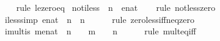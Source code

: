 \begin{isabellebody}
%
\isadelimproof
\ \ %
\endisadelimproof
%
\isatagproof
{}\isamarkupfalse%
\ {\isacharparenleft}rule\ le{\isacharunderscore}zero{\isacharunderscore}eq{\isacharparenright}%
\endisatagproof
{\isafoldproof}%
%
\isadelimproof
\isanewline
%
\endisadelimproof
\isanewline
{}\isamarkupfalse%
\ not{\isacharunderscore}iless{}{\isacharcolon}\ {\isachardoublequoteopen}{\isasymnot}\ n\ {\isacharless}\ {\isacharparenleft}{}{\isacharcolon}{\isacharcolon}enat{\isacharparenright}{\isachardoublequoteclose}\isanewline
%
\isadelimproof
\ \ %
\endisadelimproof
%
\isatagproof
{}\isamarkupfalse%
\ {\isacharparenleft}rule\ not{\isacharunderscore}less{\isacharunderscore}zero{\isacharparenright}%
\endisatagproof
{\isafoldproof}%
%
\isadelimproof
\isanewline
%
\endisadelimproof
\isanewline
{}\isamarkupfalse%
\ i{}{\isacharunderscore}less{\isacharbrackleft}simp{\isacharbrackright}{\isacharcolon}\ {\isachardoublequoteopen}{\isacharparenleft}{}{\isacharcolon}{\isacharcolon}enat{\isacharparenright}\ {\isacharless}\ n\ {\isasymlongleftrightarrow}\ n\ {\isasymnoteq}\ {}{\isachardoublequoteclose}\isanewline
%
\isadelimproof
\ \ %
\endisadelimproof
%
\isatagproof
{}\isamarkupfalse%
\ {\isacharparenleft}rule\ zero{\isacharunderscore}less{\isacharunderscore}iff{\isacharunderscore}neq{\isacharunderscore}zero{\isacharparenright}%
\endisatagproof
{\isafoldproof}%
%
\isadelimproof
\isanewline
%
\endisadelimproof
\isanewline
{}\isamarkupfalse%
\ imult{\isacharunderscore}is{\isacharunderscore}{}{\isacharcolon}\ {\isachardoublequoteopen}{\isacharparenleft}{\isacharparenleft}m{\isacharcolon}{\isacharcolon}enat{\isacharparenright}\ {\isacharasterisk}\ n\ {\isacharequal}\ {}{\isacharparenright}\ {\isacharequal}\ {\isacharparenleft}m\ {\isacharequal}\ {}\ {\isasymor}\ n\ {\isacharequal}\ {}{\isacharparenright}{\isachardoublequoteclose}\isanewline
%
\isadelimproof
\ \ %
\endisadelimproof
%
\isatagproof
{}\isamarkupfalse%
\ {\isacharparenleft}rule\ mult{\isacharunderscore}eq{\isacharunderscore}{}{\isacharunderscore}iff{\isacharparenright}%
\endisatagproof
{\isafoldproof}%
%
\isadelimproof
\isanewline
%
\endisadelimproof
%
\isadelimtheory
\isanewline
%
\endisadelimtheory
%
\isatagtheory
{}\isamarkupfalse%
%
\endisatagtheory
{\isafoldtheory}%
%
\isadelimtheory
%
\endisadelimtheory
%
\end{isabellebody}%
\endinput
